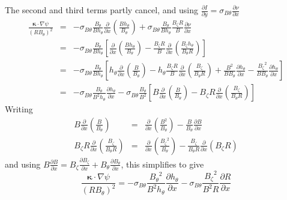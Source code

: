 \documentclass[12pt, a4paper]{article}
\newcommand{\deriv}[2]{\ensuremath{\frac{\partial #1}{\partial #2}}}
\newcommand{\hthe}{\ensuremath{h_\theta}}
\newcommand{\Bp}{\ensuremath{B_\theta}}
\newcommand{\Bt}{\ensuremath{B_\zeta}}
\newcommand{\Vec}[1]{\ensuremath{\mathbf{#1}}}
\newcommand{\kvec}{\Vec{\kappa}}
\newcommand{\rbp}{\ensuremath{R\Bp}}
\newcommand{\rbpsq}{\ensuremath{\left(\rbp\right)^2}}
\newcommand{\sbp}{\ensuremath{\sigma_{B\theta}}}
\begin{document}
The second and third terms partly cancel, and using $\deriv{I}{y} = \sbp \deriv{\nu}{x}$
\begin{eqnarray*}
  \frac{\kvec\cdot\nabla\psi}{\rbpsq} &=& -\sbp\frac{\Bp}{B\hthe}\deriv{}{x}\left(\frac{B\hthe}{\Bp}\right) + \sbp\frac{\Bp}{B\hthe}\frac{\Bt R}{B}\deriv{\nu}{x} \\
  &=& -\sbp\frac{\Bp}{B\hthe}\left[\deriv{}{x}\left(\frac{B\hthe}{\Bp}\right) - \frac{\Bt R}{B}\deriv{}{x}\left(\frac{\Bt\hthe}{\Bp R}\right)\right] \\
  &=& -\sbp\frac{\Bp}{B\hthe}\left[\hthe\deriv{}{x}\left(\frac{B}{\Bp}\right) - \hthe\frac{\Bt R}{B}\deriv{}{x}\left(\frac{\Bt}{\Bp R}\right) + \frac{B^2}{B\Bp}\deriv{\hthe}{x} - \frac{\Bt^2}{B\Bp}\deriv{\hthe}{x}\right] \\
  &=& -\sbp \frac{\Bp}{B^2\hthe}\deriv{\hthe}{x} - \sbp\frac{\Bp}{B^2}\left[B\deriv{}{x}\left(\frac{B}{\Bp}\right) - \Bt R\deriv{}{x}\left(\frac{\Bt}{\Bp R}\right)\right]
\end{eqnarray*}
Writing
\begin{eqnarray*}
B\deriv{}{x}\left(\frac{B}{\Bp}\right) &=& \deriv{}{x}\left(\frac{B^2}{\Bp}\right) - \frac{B}{\Bp}\deriv{B}{x} \\
\Bt R\deriv{}{x}\left(\frac{\Bt}{\Bp R}\right) &=& \deriv{}{x}\left(\frac{\Bt^2}{\Bp}\right) - \frac{\Bt}{\Bp R}\deriv{}{x}\left(\Bt R\right)
\end{eqnarray*}
and using $B\deriv{B}{x} = \Bt\deriv{\Bt}{x} + \Bp\deriv{\Bp}{x}$, this simplifies to give
\begin{equation}
\frac{\kvec\cdot\nabla\psi}{\rbpsq} = -\sbp\frac{\Bp^2}{B^2\hthe}\deriv{\hthe}{x} - \sbp\frac{\Bt^2}{B^2 R}\deriv{R}{x}
\label{eq:dhdpsi}
\end{equation}
\end{document}
